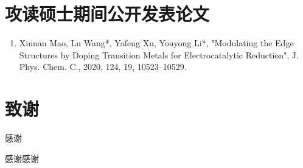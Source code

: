 \chapter{攻读硕士期间公开发表论文}

{
\setlist[enumerate]{}%
\begin{enumerate}[nosep]
    \item Xinnan Mao, Lu Wang*, Yafeng Xu, Youyong Li*, "Modulating the  Edge Structures by Doping Transition Metals for Electrocatalytic  Reduction", J. Phys. Chem. C., 2020, 124, 19, 10523–10529.
\end{enumerate}
}

\chapter[致谢]{致\quad 谢}%

感谢

感谢感谢

\cleardoublepage[plain]%
